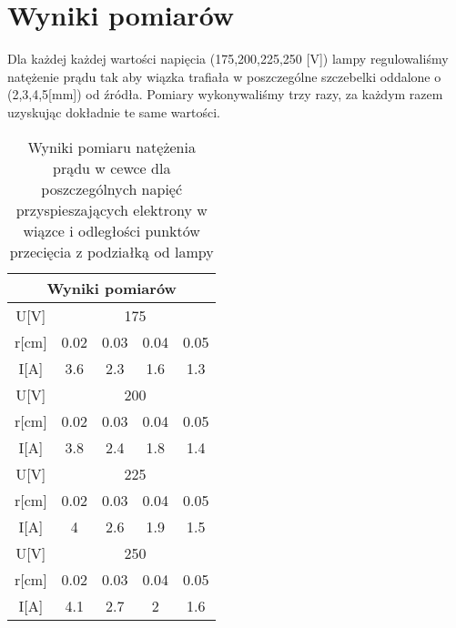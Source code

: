 \documentclass{article}
\begin{document}

 


\section{Wyniki pomiarów}

Dla każdej każdej wartości napięcia (175,200,225,250 [V]) lampy regulowaliśmy natężenie prądu tak aby wiązka trafiała w poszczególne szczebelki oddalone o (2,3,4,5[mm]) od źródła. Pomiary wykonywaliśmy trzy razy, za każdym razem uzyskując dokładnie te same wartości.

\begin{table}[htbp]
\centering
\begin{tabular}{|c|c|c|c|c|}
\hline
\multicolumn{5}{|c|}{Wyniki pomiarów}  \\ \hline
U[V] & \multicolumn{4}{|c|}{175} \\ \hline
r[cm] & 0.02 & 0.03 & 0.04 & 0.05 \\ \hline
I[A] & 3.6 & 2.3 & 1.6 & 1.3 \\ \hline

U[V] & \multicolumn{4}{|c|}{200} \\ \hline
r[cm] & 0.02 & 0.03 & 0.04 & 0.05 \\ \hline
I[A] & 3.8 & 2.4 & 1.8 & 1.4 \\ \hline 

U[V] & \multicolumn{4}{|c|}{225} \\ \hline
r[cm] & 0.02 & 0.03 & 0.04 & 0.05 \\ \hline
I[A] & 4 & 2.6 & 1.9 & 1.5 \\ \hline

U[V] & \multicolumn{4}{|c|}{250} \\ \hline
r[cm] & 0.02 & 0.03 & 0.04 & 0.05 \\ \hline
I[A] & 4.1 & 2.7 & 2 & 1.6 \\ \hline
\end{tabular}
\caption{Wyniki pomiaru natężenia prądu w cewce dla poszczególnych napięć przyspieszających elektrony w wiązce i odległości punktów przecięcia z podziałką od lampy }
\label{}
\end{table}
\end{document}
